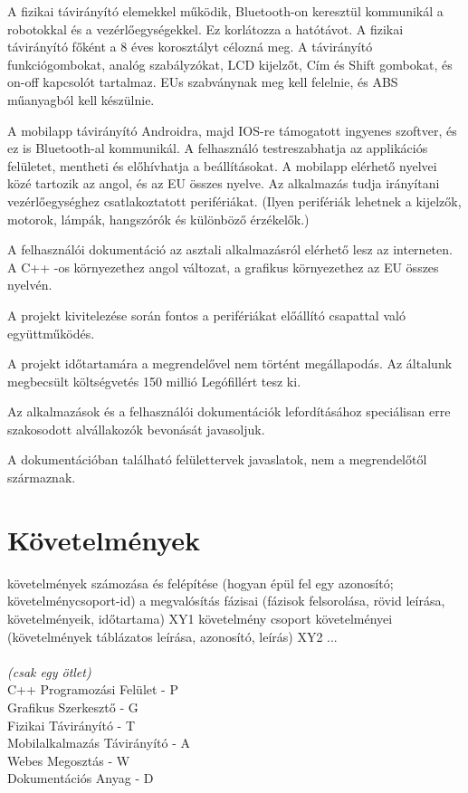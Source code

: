\documentclass{article}
\begin{document}
A fizikai távirányító elemekkel működik, Bluetooth-on keresztül kommunikál a robotokkal és a vezérlőegységekkel. Ez korlátozza a hatótávot. A fizikai távirányító főként a 8 éves korosztályt célozná meg. A távirányító funkciógombokat, analóg szabályzókat, LCD kijelzőt, Cím és Shift gombokat,  és on-off kapcsolót tartalmaz. EUs szabványnak meg kell felelnie, és ABS műanyagból kell készülnie.
\newline

A mobilapp távirányító Androidra, majd IOS-re támogatott ingyenes szoftver, és ez is Bluetooth-al kommunikál. A felhasználó testreszabhatja az applikációs felületet, mentheti és előhívhatja a beállításokat. A mobilapp elérhető nyelvei közé tartozik az angol, és az EU összes nyelve. Az alkalmazás tudja irányítani vezérlőegységhez csatlakoztatott perifériákat. (Ilyen perifériák lehetnek a kijelzők, motorok, lámpák, hangszórók és különböző érzékelők.)
\newline

A felhasználói dokumentáció az asztali alkalmazásról elérhető lesz az interneten. A C++ -os környezethez angol változat, a grafikus környezethez az EU összes nyelvén.
\newline

A projekt kivitelezése során fontos a perifériákat előállító csapattal való együttműködés.
\newline

A projekt időtartamára a megrendelővel nem történt megállapodás. 
Az általunk megbecsült költségvetés 150 millió Legófillért tesz ki.
\newline

Az alkalmazások és a felhasználói dokumentációk lefordításához speciálisan erre szakosodott alvállakozók bevonását javasoljuk. 
\newline

A dokumentációban található felülettervek javaslatok, nem a megrendelőtől származnak.


\pagebreak
\section{Követelmények}

követelmények számozása és felépítése (hogyan épül fel egy azonosító; követelménycsoport-id)
a megvalósítás fázisai (fázisok felsorolása, rövid leírása, követelményeik, időtartama) 
XY1 követelmény csoport követelményei (követelmények táblázatos leírása, azonosító, leírás)
XY2 ... \\
\\
\textit{(csak egy ötlet)} \\
C++ Programozási Felület - P \\
Grafikus Szerkesztő - G \\
Fizikai Távirányító - T \\
Mobilalkalmazás Távirányító - A \\
Webes Megosztás - W \\
Dokumentációs Anyag - D \\
\end{document}
